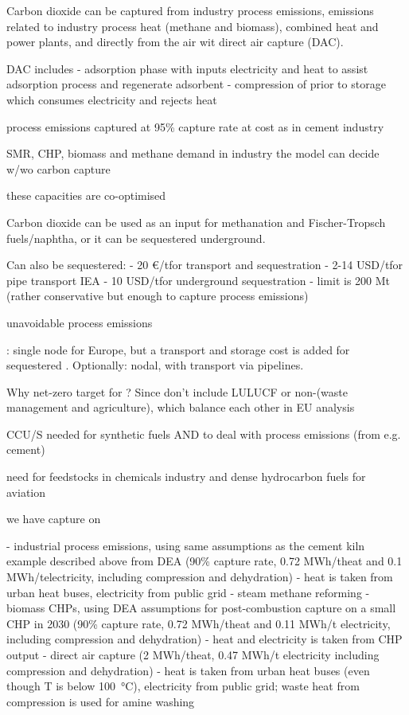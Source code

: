 Carbon dioxide can be captured from industry process emissions, emissions
related to industry process heat (methane and biomass), combined heat and power plants, and directly
from the air wit direct air capture (DAC).

DAC includes
- adsorption phase with inputs electricity and heat to assist adsorption process and regenerate adsorbent
- compression of \co prior to storage which consumes electricity and rejects heat

process emissions captured at 95\% capture rate at cost as in cement industry

SMR, CHP, biomass and methane demand in industry the model can decide w/wo carbon capture

these capacities are co-optimised

Carbon dioxide can be used as an input for methanation and Fischer-Tropsch
fuels/naphtha, or it can be sequestered underground.

Can also be sequestered:
- 20 \euro/t\co for transport and sequestration
- 2-14 USD/t\co for pipe transport IEA
- 10 USD/t\co for underground sequestration
- limit is 200 Mt (rather conservative but enough to capture process emissions)

unavoidable process emissions

\co: single node for Europe, but a transport and storage cost is added for sequestered \co. Optionally: nodal, with \co transport via pipelines.

Why net-zero target for \co? Since don't include LULUCF or non-\co (waste management and agriculture), which balance each other in EU analysis

CCU/S needed for synthetic fuels AND to deal with process emissions (from e.g.
cement)



need for feedstocks in chemicals industry and dense hydrocarbon fuels for aviation

we have capture on

- industrial process emissions, using same assumptions as the cement kiln
example described above from DEA  (90\% capture rate, 0.72 MWh/t\co heat and
0.1 MWh/t\co electricity, including compression and dehydration) - heat is
taken from urban heat buses, electricity from public grid - steam methane
reforming - biomass CHPs, using DEA assumptions for post-combustion capture on a
small CHP in 2030 (90\% capture rate, 0.72 MWh/t\co heat and 0.11 MWh/t\co
electricity, including compression and dehydration) - heat and electricity is
taken from CHP output - direct air capture (2 MWh/t\co heat, 0.47 MWh/t\co
electricity including compression and dehydration) - heat is taken from urban
heat buses (even though T is below \SI{100}{\celsius}), electricity from public grid; waste
heat from compression is used for amine washing


